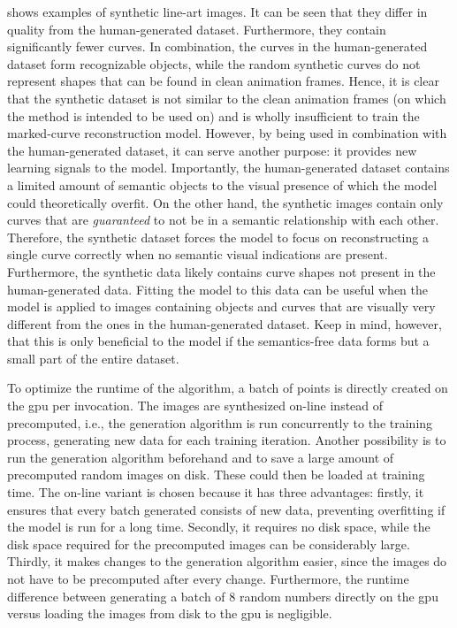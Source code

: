 shows examples of synthetic line-art images. It can be seen that they differ in quality from the human-generated dataset. Furthermore, they contain significantly fewer curves. In combination, the curves in the human-generated dataset form recognizable objects, while the random synthetic curves do not represent shapes that can be found in clean animation frames. Hence, it is clear that the synthetic dataset is not similar to the clean animation frames (on which the method is intended to be used on) and is wholly insufficient to train the marked-curve reconstruction model. However, by being used in combination with the human-generated dataset, it can serve another purpose: it provides new learning signals to the model. Importantly, the human-generated dataset contains a limited amount of semantic objects to the visual presence of which the model could theoretically overfit. On the other hand, the synthetic images contain only curves that are \textit{guaranteed} to not be in a semantic relationship with each other. Therefore, the synthetic dataset forces the model to focus on reconstructing a single curve correctly when no semantic visual indications are present. Furthermore, the synthetic data likely contains curve shapes not present in the human-generated data. Fitting the model to this data can be useful when the model is applied to images containing objects and curves that are visually very different from the ones in the human-generated dataset. Keep in mind, however, that this is only beneficial to the model if the semantics-free data forms but a small part of the entire dataset.

To optimize the runtime of the algorithm, a batch of points is directly created on the \gls{gpu} per invocation. The images are synthesized on-line instead of precomputed, i.e., the generation algorithm is run concurrently to the training process, generating new data for each training iteration. Another possibility is to run the generation algorithm beforehand and to save a large amount of precomputed random images on disk. These could then be loaded at training time. The on-line variant is chosen because it has three advantages: firstly, it ensures that every batch generated consists of new data, preventing overfitting if the model is run for a long time. Secondly, it requires no disk space, while the disk space required for the precomputed images can be considerably large. Thirdly, it makes changes to the generation algorithm easier, since the images do not have to be precomputed after every change. Furthermore, the runtime difference between generating a batch of 8 random numbers directly on the \gls{gpu} versus loading the images from disk to the \gls{gpu} is negligible.

